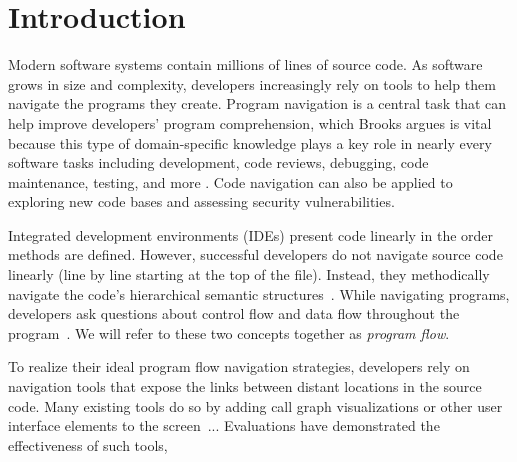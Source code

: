 \documentclass[conference]{IEEEtran}
\begin{document}
\IEEEpeerreviewmaketitle


\section{Introduction}
Modern software systems contain millions of lines of source code. 
As software grows in size and complexity, developers increasingly rely on tools to help them navigate the programs they create. 
Program navigation is a central task that can help improve developers' program comprehension, which Brooks argues is vital because this type of domain-specific knowledge plays a key role in nearly every software tasks including development, code reviews, debugging, code maintenance, testing, and more \cite{BrooksComprehension}. Code navigation can also be applied to exploring new code bases and assessing security vulnerabilities. 

Integrated development environments (IDEs) present code linearly in the order methods are defined. 
However, successful developers do not navigate source code linearly (line by line starting at the top of the file). 
Instead, they methodically navigate the code's hierarchical semantic structures~\cite{robillard2004investigate}.
While navigating programs, developers ask questions about control flow and data flow throughout the program~\cite{latoza2010hard, Smith2015}. 
We will refer to these two concepts together as \textit{program flow}. 

To realize their ideal program flow navigation strategies, developers rely on navigation tools that expose the links between distant locations in the source code. 
Many existing tools do so by adding call graph visualizations or other user interface elements to the screen~\cite{}... 
Evaluations have demonstrated the effectiveness of such tools, 


\end{document}

